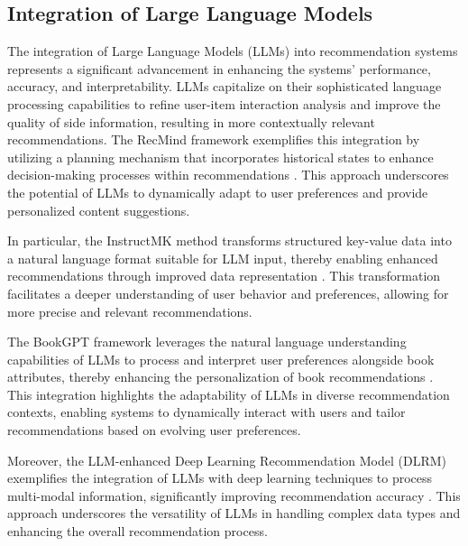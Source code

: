 
 








\subsection{Integration of Large Language Models} \label{subsec:Integration of Large Language Models}

The integration of Large Language Models (LLMs) into recommendation systems represents a significant advancement in enhancing the systems' performance, accuracy, and interpretability. LLMs capitalize on their sophisticated language processing capabilities to refine user-item interaction analysis and improve the quality of side information, resulting in more contextually relevant recommendations. The RecMind framework exemplifies this integration by utilizing a planning mechanism that incorporates historical states to enhance decision-making processes within recommendations \cite{wang2023recmind}. This approach underscores the potential of LLMs to dynamically adapt to user preferences and provide personalized content suggestions.

In particular, the InstructMK method transforms structured key-value data into a natural language format suitable for LLM input, thereby enabling enhanced recommendations through improved data representation \cite{wang2023multiple}. This transformation facilitates a deeper understanding of user behavior and preferences, allowing for more precise and relevant recommendations.

The BookGPT framework leverages the natural language understanding capabilities of LLMs to process and interpret user preferences alongside book attributes, thereby enhancing the personalization of book recommendations \cite{zhiyuli2023bookgptgeneralframeworkbook}. This integration highlights the adaptability of LLMs in diverse recommendation contexts, enabling systems to dynamically interact with users and tailor recommendations based on evolving user preferences.

Moreover, the LLM-enhanced Deep Learning Recommendation Model (DLRM) exemplifies the integration of LLMs with deep learning techniques to process multi-modal information, significantly improving recommendation accuracy \cite{tian2024mmrecllmbasedmultimodal}. This approach underscores the versatility of LLMs in handling complex data types and enhancing the overall recommendation process.

